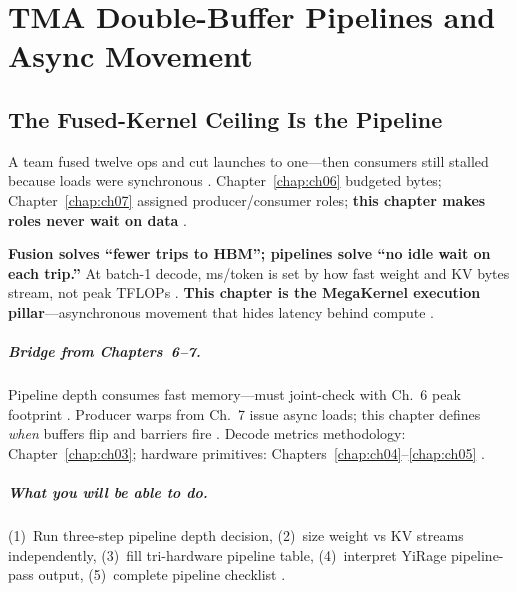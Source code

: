 \chapter{TMA Double-Buffer Pipelines and Async Movement}
\label{chap:ch08}

\section{The Fused-Kernel Ceiling Is the Pipeline}
\label{sec:industrial_hook}

A team fused twelve ops and cut launches to one---then consumers still stalled because loads were synchronous \citep{shah2024flashattention3,memoryfloor2026,taxbreak2026}.
Chapter~\ref{chap:ch06} budgeted bytes; Chapter~\ref{chap:ch07} assigned producer/consumer roles; \textbf{this chapter makes roles never wait on data} \citep{yirage2026,semianalysis2024tma,dao2022flashattention}.

\textbf{Fusion solves ``fewer trips to HBM''; pipelines solve ``no idle wait on each trip.''} At batch-1 decode, ms/token is set by how fast weight and KV bytes stream, not peak TFLOPs \citep{patel2025llminference,kwon2023vllm,memoryfloor2026}.
\textbf{This chapter is the MegaKernel execution pillar}---asynchronous movement that hides latency behind compute \citep{shah2024flashattention3,amd2024aie}.

\paragraph{Bridge from Chapters~6--7.}
Pipeline depth consumes fast memory---must joint-check with Ch.~6 peak footprint \citep{yirage2026,dao2022flashattention,chen2020compilerbasedhardw}.
Producer warps from Ch.~7 issue async loads; this chapter defines \emph{when} buffers flip and barriers fire \citep{shah2024flashattention3,semianalysis2024tma}.
Decode metrics methodology: Chapter~\ref{chap:ch03}; hardware primitives: Chapters~\ref{chap:ch04}--\ref{chap:ch05} \citep{patel2025llminference,nvidia2022hopper,amd2024xdna}.

\paragraph{What you will be able to do.}
(1)~Run three-step pipeline depth decision, (2)~size weight vs KV streams independently, (3)~fill tri-hardware pipeline table, (4)~interpret YiRage pipeline-pass output, (5)~complete pipeline checklist \citep{yirage2026,shah2024flashattention3,taxbreak2026}.

